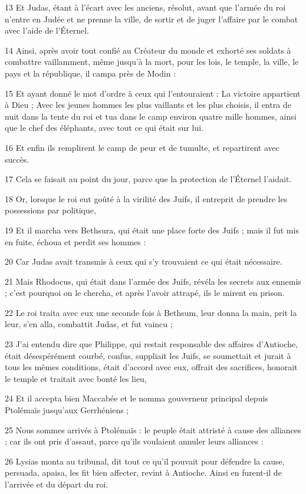 \par 13 Et Judas, étant à l'écart avec les anciens, résolut, avant que l'armée du roi n'entre en Judée et ne prenne la ville, de sortir et de juger l'affaire par le combat avec l'aide de l'Éternel.
\par 14 Ainsi, après avoir tout confié au Créateur du monde et exhorté ses soldats à combattre vaillamment, même jusqu'à la mort, pour les lois, le temple, la ville, le pays et la république, il campa près de Modin :
\par 15 Et ayant donné le mot d'ordre à ceux qui l'entouraient : La victoire appartient à Dieu ; Avec les jeunes hommes les plus vaillants et les plus choisis, il entra de nuit dans la tente du roi et tua dans le camp environ quatre mille hommes, ainsi que le chef des éléphants, avec tout ce qui était sur lui.
\par 16 Et enfin ils remplirent le camp de peur et de tumulte, et repartirent avec succès.
\par 17 Cela se faisait au point du jour, parce que la protection de l'Éternel l'aidait.
\par 18 Or, lorsque le roi eut goûté à la virilité des Juifs, il entreprit de prendre les possessions par politique,
\par 19 Et il marcha vers Bethsura, qui était une place forte des Juifs ; mais il fut mis en fuite, échoua et perdit ses hommes :
\par 20 Car Judas avait transmis à ceux qui s'y trouvaient ce qui était nécessaire.
\par 21 Mais Rhodocus, qui était dans l'armée des Juifs, révéla les secrets aux ennemis ; c'est pourquoi on le chercha, et après l'avoir attrapé, ils le mirent en prison.
\par 22 Le roi traita avec eux une seconde fois à Bethsum, leur donna la main, prit la leur, s'en alla, combattit Judas, et fut vaincu ;
\par 23 J'ai entendu dire que Philippe, qui restait responsable des affaires d'Antioche, était désespérément courbé, confus, suppliait les Juifs, se soumettait et jurait à tous les mêmes conditions, était d'accord avec eux, offrait des sacrifices, honorait le temple et traitait avec bonté les lieu,
\par 24 Et il accepta bien Maccabée et le nomma gouverneur principal depuis Ptolémaïs jusqu'aux Gerrhéniens ;
\par 25 Nous sommes arrivés à Ptolémaïs : le peuple était attristé à cause des alliances ; car ils ont pris d'assaut, parce qu'ils voulaient annuler leurs alliances :
\par 26 Lysias monta au tribunal, dit tout ce qu'il pouvait pour défendre la cause, persuada, apaisa, les fit bien affecter, revint à Antioche. Ainsi en furent-il de l'arrivée et du départ du roi.

